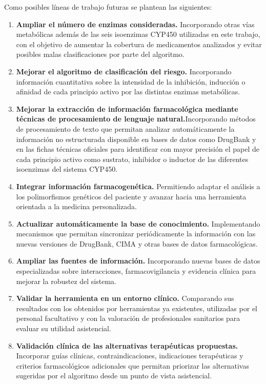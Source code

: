 
Como posibles líneas de trabajo futuras se plantean las siguientes:
\begin{enumerate}
    \item \textbf{Ampliar el número de enzimas consideradas.} Incorporando otras vías metabólicas además de las seis isoenzimas CYP450 utilizadas en este trabajo, con el objetivo de aumentar la cobertura de medicamentos analizados y evitar posibles malas clasificaciones por parte del algoritmo.
    \item \textbf{Mejorar el algoritmo de clasificación del riesgo.} Incorporando información cuantitativa sobre la intensidad de la inhibición, inducción o afinidad de cada principio activo por las distintas enzimas metabólicas.
    \item \textbf{Mejorar la extracción de información farmacológica mediante técnicas de procesamiento de lenguaje natural.}Incorporando métodos de procesamiento de texto que permitan analizar automáticamente la información no estructurada disponible en bases de datos como DrugBank y en las fichas técnicas oficiales para identificar con mayor precisión el papel de cada principio activo como sustrato, inhibidor o inductor de las diferentes isoenzimas del sistema CYP450.
    \item \textbf{Integrar información farmacogenética.} Permitiendo adaptar el análisis a los polimorfismos genéticos del paciente y avanzar hacia una herramienta orientada a la medicina personalizada.
    \item \textbf{Actualizar automáticamente la base de conocimiento.} Implementando mecanismos que permitan sincronizar periódicamente la información con las nuevas versiones de DrugBank, CIMA y otras bases de datos farmacológicas.
    \item \textbf{Ampliar las fuentes de información.} Incorporando nuevas bases de datos especializadas sobre interacciones, farmacovigilancia y evidencia clínica para mejorar la robustez del sistema.
    \item \textbf{Validar la herramienta en un entorno clínico.} Comparando sus resultados con los obtenidos por herramientas ya existentes, utilizadas por el personal facultativo y con la valoración de profesionales sanitarios para evaluar su utilidad asistencial.
    \item \textbf{Validación clínica de las alternativas terapéuticas propuestas.} Incorporar guías clínicas, contraindicaciones, indicaciones terapéuticas y criterios farmacológicos adicionales que permitan priorizar las alternativas sugeridas por el algoritmo desde un punto de vista asistencial.

\end{enumerate}
